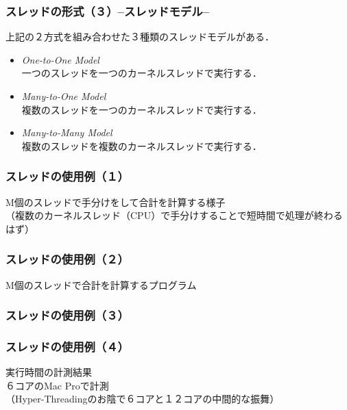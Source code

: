 \documentclass[unicode,handout]{beamer}                   %
\begin{document}
\begin{frame}
  \frametitle{スレッドの形式（３）--スレッドモデル--}
  上記の２方式を組み合わせた３種類のスレッドモデルがある．
  \vfill
  \begin{itemize}
  \item \emph{One-to-One Model}   \\
    一つのスレッドを一つのカーネルスレッドで実行する．
  \item \emph{Many-to-One Model}  \\
    複数のスレッドを一つのカーネルスレッドで実行する．
  \item \emph{Many-to-Many Model} \\
    複数のスレッドを複数のカーネルスレッドで実行する．
  \end{itemize}
  \vfill
\end{frame}

\begin{frame}
  \frametitle{スレッドの使用例（１）}
  M個のスレッドで手分けをして合計を計算する様子 \\
  （複数のカーネルスレッド（CPU）で手分けすることで短時間で処理が終わるはず）
  \vfill
\end{frame}

\begin{frame}
  \frametitle{スレッドの使用例（２）}
  M個のスレッドで合計を計算するプログラム \\
  \vfill
  \vfill
\end{frame}

\begin{frame}
  \frametitle{スレッドの使用例（３）}
  \vfill
\end{frame}

\begin{frame}
  \frametitle{スレッドの使用例（４）}
  実行時間の計測結果 \\
  \vfill
  \vfill
  \vfill
  ６コアのMac Proで計測\\
  （Hyper-Threadingのお陰で６コアと１２コアの中間的な振舞）
  \vfill
\end{frame}
\end{document}
